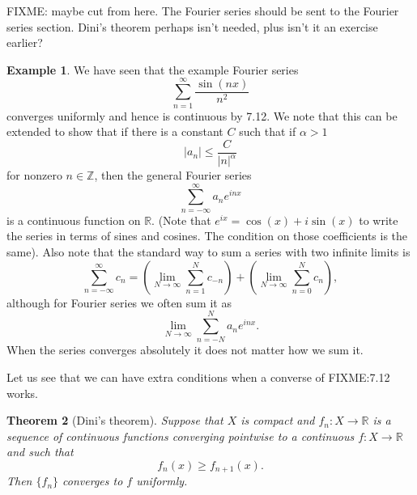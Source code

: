 \documentclass[12pt]{book}
\newcommand{\abs}[1]{\left\lvert {#1} \right\rvert}
\newcommand{\R}{{\mathbb{R}}}
\newcommand{\Z}{{\mathbb{Z}}}
\theoremstyle{plain}
\newtheorem{thm}{Theorem}[section]
\theoremstyle{remark}
\theoremstyle{definition}
\theoremstyle{exercise}
\theoremstyle{example}
\newtheorem{example}[thm]{Example}
\begin{document}
FIXME: maybe cut from here.  The Fourier series should be sent to the
Fourier series section.  Dini's theorem perhaps isn't needed, plus isn't it
an exercise earlier?

\begin{example}
We have seen that the example Fourier series 
\begin{equation*}
\sum_{n=1}^\infty \frac{\sin(nx)}{n^2}
\end{equation*}
converges uniformly and hence is continuous by 7.12.  We note that this
can be extended to show that if there is a constant $C$ such that
if $\alpha > 1$
\begin{equation*}
\abs{a_n} \leq \frac{C}{\abs{n}^\alpha}
\end{equation*}
for nonzero $n \in \Z$, then the general Fourier series
\begin{equation*}
\sum_{n=-\infty}^\infty a_n e^{inx}
\end{equation*}
is a continuous function on $\R$.
(Note that $e^{ix} = \cos(x)+i\sin(x)$ to write the series in terms of sines
and cosines.  The condition on those coefficients is the same).
Also note that the standard way to sum a series with two infinite limits
is
\begin{equation*}
\sum_{n=-\infty}^\infty c_n
=
\left(
\lim_{N \to \infty}
\sum_{n=1}^{N} c_{-n}
\right)
+
\left(
\lim_{N \to \infty}
\sum_{n=0}^N c_n
\right) ,
\end{equation*}
although for Fourier series we often sum it as
\begin{equation*}
\lim_{N\to\infty}
\sum_{n=-N}^N a_n e^{inx} .
\end{equation*}
When the series converges absolutely it does not matter how we sum it.
\end{example}

Let us see that we can have extra conditions when a converse of FIXME:7.12 works.

\begin{thm}[Dini's theorem]
Suppose that $X$ is compact and $f_n \colon X \to \R$ is a sequence of
continuous functions converging pointwise to a continuous $f \colon X \to
\R$ and such that
\begin{equation*}
f_n(x) \geq f_{n+1}(x).
\end{equation*}
Then
$\{ f_n \}$ converges to $f$ uniformly.
\end{thm}
\end{document}
